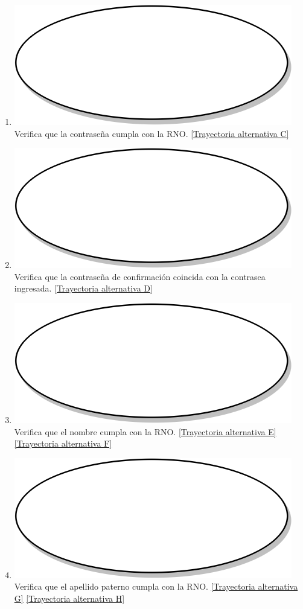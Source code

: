 \begin{enumerate}
  \item {\includegraphics[scale=.05]{Capitulo3/img/proceso.png} Verifica que la contraseña cumpla con la RNO. \hyperref[cu2_ta_c]{[Trayectoria alternativa C]}}
  \item {\includegraphics[scale=.05]{Capitulo3/img/proceso.png} Verifica que la contraseña de confirmación coincida con la contrasea ingresada. \hyperref[cu2_ta_d]{[Trayectoria alternativa D]}}
  \item {\includegraphics[scale=.05]{Capitulo3/img/proceso.png} Verifica que el nombre cumpla con la RNO. \hyperref[cu2_ta_e]{[Trayectoria alternativa E]} \hyperref[cu2_ta_f]{[Trayectoria alternativa F]}}
  \item {\includegraphics[scale=.05]{Capitulo3/img/proceso.png} Verifica que el apellido paterno cumpla con la RNO. \hyperref[cu2_ta_g]{[Trayectoria alternativa G]} \hyperref[cu2_ta_h]{[Trayectoria alternativa H]}}

\end{enumerate}
